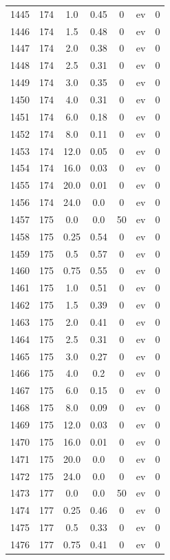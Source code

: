 \documentclass[12pt,a4paper]{article}
\begin{document}
\begin{tabular}{r|cccccc}
	1445 & 174 & 1.0 & 0.45 & 0 & ev & 0 \\
	1446 & 174 & 1.5 & 0.48 & 0 & ev & 0 \\
	1447 & 174 & 2.0 & 0.38 & 0 & ev & 0 \\
	1448 & 174 & 2.5 & 0.31 & 0 & ev & 0 \\
	1449 & 174 & 3.0 & 0.35 & 0 & ev & 0 \\
	1450 & 174 & 4.0 & 0.31 & 0 & ev & 0 \\
	1451 & 174 & 6.0 & 0.18 & 0 & ev & 0 \\
	1452 & 174 & 8.0 & 0.11 & 0 & ev & 0 \\
	1453 & 174 & 12.0 & 0.05 & 0 & ev & 0 \\
	1454 & 174 & 16.0 & 0.03 & 0 & ev & 0 \\
	1455 & 174 & 20.0 & 0.01 & 0 & ev & 0 \\
	1456 & 174 & 24.0 & 0.0 & 0 & ev & 0 \\
	1457 & 175 & 0.0 & 0.0 & 50 & ev & 0 \\
	1458 & 175 & 0.25 & 0.54 & 0 & ev & 0 \\
	1459 & 175 & 0.5 & 0.57 & 0 & ev & 0 \\
	1460 & 175 & 0.75 & 0.55 & 0 & ev & 0 \\
	1461 & 175 & 1.0 & 0.51 & 0 & ev & 0 \\
	1462 & 175 & 1.5 & 0.39 & 0 & ev & 0 \\
	1463 & 175 & 2.0 & 0.41 & 0 & ev & 0 \\
	1464 & 175 & 2.5 & 0.31 & 0 & ev & 0 \\
	1465 & 175 & 3.0 & 0.27 & 0 & ev & 0 \\
	1466 & 175 & 4.0 & 0.2 & 0 & ev & 0 \\
	1467 & 175 & 6.0 & 0.15 & 0 & ev & 0 \\
	1468 & 175 & 8.0 & 0.09 & 0 & ev & 0 \\
	1469 & 175 & 12.0 & 0.03 & 0 & ev & 0 \\
	1470 & 175 & 16.0 & 0.01 & 0 & ev & 0 \\
	1471 & 175 & 20.0 & 0.0 & 0 & ev & 0 \\
	1472 & 175 & 24.0 & 0.0 & 0 & ev & 0 \\
	1473 & 177 & 0.0 & 0.0 & 50 & ev & 0 \\
	1474 & 177 & 0.25 & 0.46 & 0 & ev & 0 \\
	1475 & 177 & 0.5 & 0.33 & 0 & ev & 0 \\
	1476 & 177 & 0.75 & 0.41 & 0 & ev & 0 \\

\end{tabular}
\end{document}
